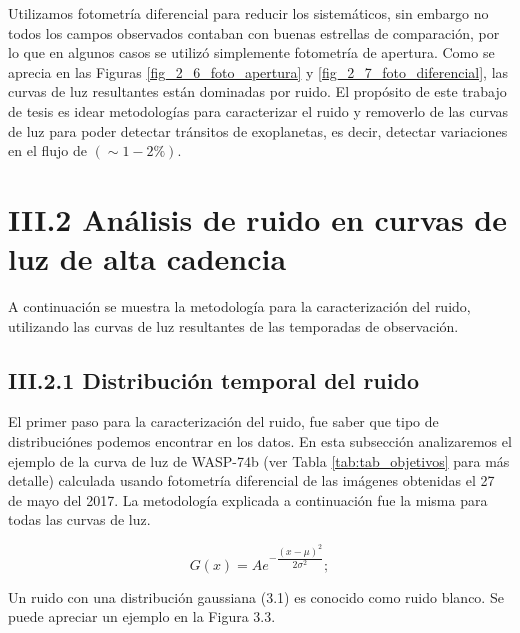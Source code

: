 Utilizamos fotometría diferencial para reducir los sistemáticos, sin embargo no todos los campos observados contaban con buenas estrellas de comparación, por lo que en algunos casos se utilizó simplemente fotometría de apertura. Como se aprecia en las Figuras \ref{fig_2_6_foto_apertura} y \ref{fig_2_7_foto_diferencial}, las curvas de luz resultantes están dominadas por ruido. El propósito de este trabajo de tesis es idear metodologías para caracterizar el ruido y removerlo de las curvas de luz para poder detectar tránsitos de exoplanetas, es decir, detectar variaciones en el flujo de $(\sim 1-2 \%)$.

\section*{III.2 Análisis de ruido en curvas de luz de alta cadencia}

A continuación se muestra la metodología para la caracterización del ruido, utilizando las curvas de luz resultantes de las temporadas de observación.

\subsection*{III.2.1 Distribución temporal del ruido}

El primer paso para la caracterización del ruido, fue saber que tipo de distribuciónes podemos encontrar en los datos. En esta subsección analizaremos el ejemplo de la curva de luz de WASP-74b (ver Tabla \ref{tab:tab_objetivos} para más detalle) calculada usando fotometría diferencial de las imágenes obtenidas el 27 de mayo del 2017. La metodología explicada a continuación fue la misma para todas las curvas de luz.

\begin{equation}
  \displaystyle G(x)=Ae^{-\dfrac{(x-\mu)^{2}}{2\sigma^{2}}};
\end{equation}

Un ruido con una distribución gaussiana (3.1) es conocido como ruido blanco. Se puede apreciar un ejemplo en la Figura 3.3.

